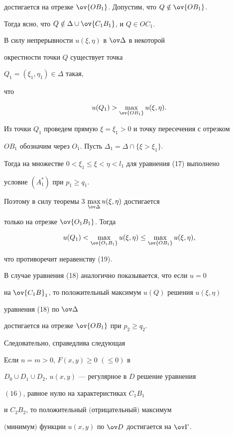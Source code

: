 достигается на отрезке $\ov {OB_1}$. Допустим, что $Q\notin \ov {OB_1}$. 


Тогда ясно, что $Q\notin \Delta \cup \ov {C_1B_1}$, и $Q\in OC_1$. 


В силу непрерывности $u(\xi,\eta)$ в $\ov \Delta$ в некоторой 


окрестности точки $Q$ существует точка


$Q_1=(\xi_1,\eta_1)\in \Delta$ такая, 


что


\begin{equation}


u(Q_1)>\max_{\ov {OB_1}}u(\xi,\eta).


\end{equation}


Из точки $Q_1$ проведем прямую $\xi=\xi_1>0$ и точку пересечения с отрезком 


$OB_1$ обозначим через $O_1$. Пусть $\Delta_1=\Delta \cap \{\xi >\xi_1\}$.


Тогда на множестве $0<\xi_1\le \xi <\eta <l_1$ для уравнения (17) выполнено 


условие $(A_1^*)$ при $p_1\ge q_1$. 


Поэтому в силу теоремы 3\; $\max\limits_{\ov \Delta }u(\xi,\eta)$ достигается 


только на отрезке $\ov {O_1B_1}$. Тогда 


$$


u(Q_1)<\max\limits_{\ov {O_1B_1}}u(\xi,\eta)\le 


\max\limits_{\ov {OB_1}}u(\xi,\eta),


$$


что противоречит неравенству (19).





В случае уравнения (18) аналогично показывается, что если $u=0$


на $\ov {C_1B}_1$, то положительный максимум $u(Q)$ решения $u(\xi,\eta)$ 


уравнения (18) по $\ov \Delta$ 


достигается на отрезке $\ov {OB_1}$ при $p_2\ge q_2$.


Следовательно, справедлива следующая





\begin{thm}


Если $n=m>0$, $F(x,y)\ge 0$ $(\le 0)$ в 


$D_0\cup D_1\cup D_2$, $u(x,y)$ --- регулярное в $D$ решение уравнения


$(16)$, равное нулю на характеристиках $C_1B_1$ 


и $C_2B_2$, то положительный $($отрицательный$)$ максимум


$($минимум$)$ функции $u(x,y)$ по $\ov D$ достигается на $\ov \Gamma$.


\end{thm} 





